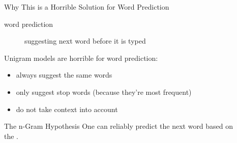\documentclass[professionalfonts, xcolor={usenames,svgnames,x11names,table}]{beamer}
\begin{document}
\begin{frame}{Why This is a Horrible Solution for Word Prediction}
    \begin{description}
        \item[word prediction] suggesting next word before it is typed
    \end{description}

    Unigram models are horrible for word prediction:
    \begin{itemize}
        \item always suggest  the same words
        \item only suggest stop words (because they're most frequent)
        \item do not take context into account
    \end{itemize}

    \begin{block}{The n-Gram Hypothesis}
        One can reliably predict the next word based on\\
        the .
    \end{block}
\end{frame}
\end{document}

